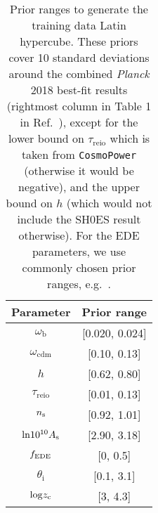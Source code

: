 \documentclass[aps, prd, reprint, superscriptaddress, nofootinbib, bibnotes]{revtex4-2}
\newcommand{\Planck}{\textit{Planck}}
\begin{document}
\begin{table}
  \centering 
  \begin{tabular}{c|c}
    \textbf{Parameter}               &  \textbf{Prior range}   \\
    \hline
    \hline
    $\omega_{\mathrm{b}}$            &   [0.020, 0.024]    \\
    \hline
    $\omega_{\mathrm{cdm}}$          &    [0.10, 0.13]        \\
    \hline
    $h$                              &    [0.62, 0.80]         \\
    \hline
    $\tau_{\mathrm{reio}}$           &    [0.01, 0.13]         \\
    \hline
    $n_{\rm{s}}$                            &     [0.92, 1.01]      \\
    \hline
    $\mathrm{ln}10^{10}A_{\rm{s}}$          &      [2.90, 3.18]       \\
    \hline
    \hline
    $f_{\rm{EDE}}$          &      [0, 0.5]       \\
    \hline
    $\theta_\mathrm{i}$          &      [0.1, 3.1]       \\
    \hline
    $\mathrm{log} z_{\rm{c}}$          &      [3, 4.3]       \\
    \hline
    \hline
    \end{tabular}
   \caption{Prior ranges to generate the training data Latin hypercube. These priors cover 10 standard deviations around the combined \Planck{} 2018 best-fit results (rightmost column in Table 1 in Ref.~\citep{Planck:2018vyg}), except for the lower bound on $\tau_{\mathrm{reio}}$ which is taken from \texttt{CosmoPower} \citep{SpurioMancini22} (otherwise it would be negative), and the upper bound on $h$ (which would not include the SH0ES \citep{Riess:2021jrx} result otherwise). For the EDE parameters, we use commonly chosen prior ranges, e.g.\ \cite{Poulin:2023lkg}.}
  \label{tab:prior_lh}
\end{table}
\end{document}
